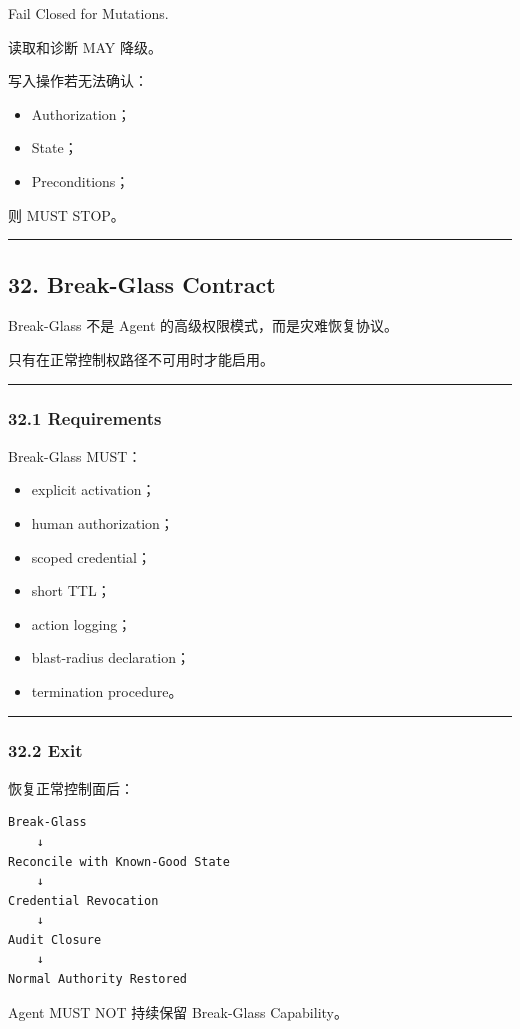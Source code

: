 \documentclass[11pt,a4paper]{article}
\begin{document}
\begin{gfmBlockquote}
Fail Closed for Mutations.
\end{gfmBlockquote}
读取和诊断 MAY 降级。

写入操作若无法确认：

\begin{itemize}
  \item Authorization；
  \item State；
  \item Preconditions；
\end{itemize}
则 MUST STOP。

\vspace{0.5em}\hrule\vspace{0.5em}
\subsection{32. Break-Glass Contract}
Break-Glass 不是 Agent 的高级权限模式，而是灾难恢复协议。

只有在正常控制权路径不可用时才能启用。

\vspace{0.5em}\hrule\vspace{0.5em}
\subsubsection{32.1 Requirements}
Break-Glass MUST：

\begin{itemize}
  \item explicit activation；
  \item human authorization；
  \item scoped credential；
  \item short TTL；
  \item action logging；
  \item blast-radius declaration；
  \item termination procedure。
\end{itemize}
\vspace{0.5em}\hrule\vspace{0.5em}
\subsubsection{32.2 Exit}
恢复正常控制面后：

\begin{lstlisting}[language=text]
Break-Glass
    ↓
Reconcile with Known-Good State
    ↓
Credential Revocation
    ↓
Audit Closure
    ↓
Normal Authority Restored
\end{lstlisting}
Agent MUST NOT 持续保留 Break-Glass Capability。
\end{document}
